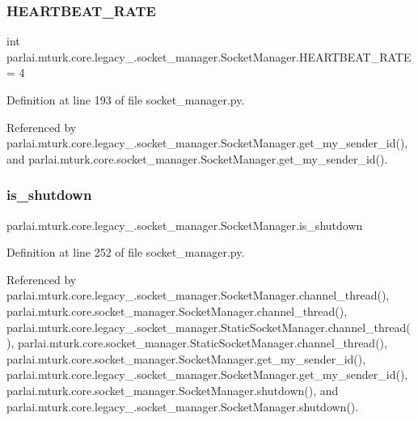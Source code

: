 \subsubsection{\texorpdfstring{H\+E\+A\+R\+T\+B\+E\+A\+T\+\_\+\+R\+A\+TE}{HEARTBEAT\_RATE}}
{\footnotesize\ttfamily int parlai.\+mturk.\+core.\+legacy\+\_.\+socket\+\_\+manager.\+Socket\+Manager.\+H\+E\+A\+R\+T\+B\+E\+A\+T\+\_\+\+R\+A\+TE = 4\hspace{0.3cm}{\ttfamily [static]}}



Definition at line 193 of file socket\+\_\+manager.\+py.



Referenced by parlai.\+mturk.\+core.\+legacy\+\_.\+socket\+\_\+manager.\+Socket\+Manager.\+get\+\_\+my\+\_\+sender\+\_\+id(), and parlai.\+mturk.\+core.\+socket\+\_\+manager.\+Socket\+Manager.\+get\+\_\+my\+\_\+sender\+\_\+id().

\mbox{\label{classparlai_1_1mturk_1_1core_1_1legacy__2018_1_1socket__manager_1_1SocketManager_a0cf172f18269d1c15c52bf0f2b7d2be6}} 
\subsubsection{\texorpdfstring{is\+\_\+shutdown}{is\_shutdown}}
{\footnotesize\ttfamily parlai.\+mturk.\+core.\+legacy\+\_.\+socket\+\_\+manager.\+Socket\+Manager.\+is\+\_\+shutdown}



Definition at line 252 of file socket\+\_\+manager.\+py.



Referenced by parlai.\+mturk.\+core.\+legacy\+\_.\+socket\+\_\+manager.\+Socket\+Manager.\+channel\+\_\+thread(), parlai.\+mturk.\+core.\+socket\+\_\+manager.\+Socket\+Manager.\+channel\+\_\+thread(), parlai.\+mturk.\+core.\+legacy\+\_.\+socket\+\_\+manager.\+Static\+Socket\+Manager.\+channel\+\_\+thread(), parlai.\+mturk.\+core.\+socket\+\_\+manager.\+Static\+Socket\+Manager.\+channel\+\_\+thread(), parlai.\+mturk.\+core.\+socket\+\_\+manager.\+Socket\+Manager.\+get\+\_\+my\+\_\+sender\+\_\+id(), parlai.\+mturk.\+core.\+legacy\+\_.\+socket\+\_\+manager.\+Socket\+Manager.\+get\+\_\+my\+\_\+sender\+\_\+id(), parlai.\+mturk.\+core.\+socket\+\_\+manager.\+Socket\+Manager.\+shutdown(), and parlai.\+mturk.\+core.\+legacy\+\_.\+socket\+\_\+manager.\+Socket\+Manager.\+shutdown().

